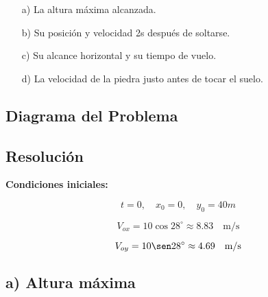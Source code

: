 \begin{enumerate}
    \item[a)] La altura máxima alcanzada.
    \item[b)] Su posición y velocidad 2s después de soltarse.
    \item[c)] Su alcance horizontal y su tiempo de vuelo.
    \item[d)] La velocidad de la piedra justo antes de tocar el suelo.
\end{enumerate}

\subsection*{Diagrama del Problema}

\begin{center}
\end{center}

\subsection*{Resolución}

\textbf{Condiciones iniciales:}

\[
t = 0, \quad x_0 = 0, \quad y_0 = 40m
\]

\[
V_{ox} = 10 \cos 28^\circ \approx 8.83 \quad \text{m/s}
\]

\[
V_{oy} = 10 \sen 28^\circ \approx 4.69 \quad \text{m/s}
\]

\subsection{a) Altura máxima}

